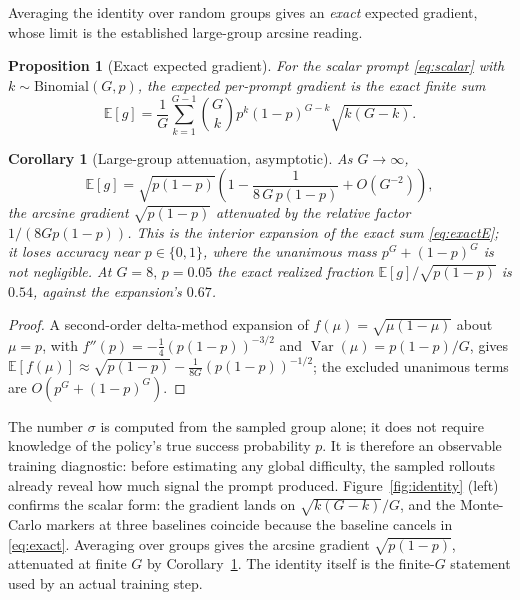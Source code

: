 \documentclass[11pt]{article}
\theoremstyle{plain}
\newtheorem{proposition}{Proposition}
\newtheorem{corollary}{Corollary}
\theoremstyle{definition}
\newcommand{\E}{\mathbb{E}}
\begin{document}
Averaging the identity over random groups gives an \emph{exact} expected gradient, whose limit is the established large-group arcsine reading.

\begin{proposition}[Exact expected gradient]
\label{prop:expectation}
For the scalar prompt \eqref{eq:scalar} with $k\sim\mathrm{Binomial}(G,p)$, the expected per-prompt gradient is the exact finite sum
\begin{equation}
\label{eq:exactE}
\E[g]=\frac1G\sum_{k=1}^{G-1}\binom{G}{k}p^k(1-p)^{G-k}\sqrt{k(G-k)} .
\end{equation}
\end{proposition}

\begin{corollary}[Large-group attenuation, asymptotic]
\label{cor:attenuation}
As $G\to\infty$,
\begin{equation}
\label{eq:attenuation}
\E[g]=\sqrt{p(1-p)}\left(1-\frac{1}{8\,G\,p(1-p)}+O(G^{-2})\right),
\end{equation}
the arcsine gradient $\sqrt{p(1-p)}$ attenuated by the relative factor $1/(8Gp(1-p))$. This is the interior expansion of the exact sum \eqref{eq:exactE}; it loses accuracy near $p\in\{0,1\}$, where the unanimous mass $p^{G}+(1-p)^{G}$ is not negligible. At $G=8,\,p=0.05$ the exact realized fraction $\E[g]/\sqrt{p(1-p)}$ is $0.54$, against the expansion's $0.67$.
\end{corollary}
\begin{proof}
A second-order delta-method expansion of $f(\mu)=\sqrt{\mu(1-\mu)}$ about $\mu=p$, with $f''(p)=-\tfrac14(p(1-p))^{-3/2}$ and $\operatorname{Var}(\mu)=p(1-p)/G$, gives $\E[f(\mu)]\approx\sqrt{p(1-p)}-\tfrac{1}{8G}(p(1-p))^{-1/2}$; the excluded unanimous terms are $O(p^{G}+(1-p)^{G})$.
\end{proof}

The number $\sigma$ is computed from the sampled group alone; it does not require knowledge of the policy's true success probability $p$. It is therefore an observable training diagnostic: before estimating any global difficulty, the sampled rollouts already reveal how much signal the prompt produced. Figure~\ref{fig:identity} (left) confirms the scalar form: the gradient lands on $\sqrt{k(G-k)}/G$, and the Monte-Carlo markers at three baselines coincide because the baseline cancels in \eqref{eq:exact}. Averaging over groups gives the arcsine gradient $\sqrt{p(1-p)}$, attenuated at finite $G$ by Corollary~\ref{cor:attenuation}. The identity itself is the finite-$G$ statement used by an actual training step.
\end{document}
